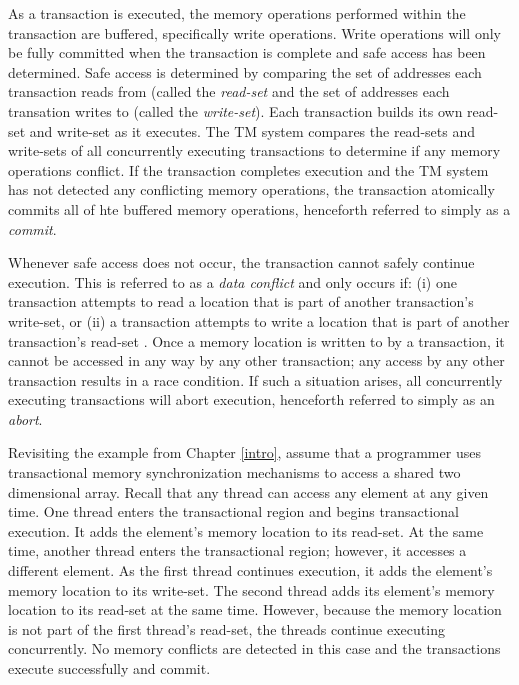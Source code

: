 \documentclass[11pt]{book}
\begin{document}


As a transaction is executed, the memory operations performed within the transaction are
buffered, specifically write operations.  Write operations will only be fully committed
when the transaction is complete and safe access has been determined.  Safe access is
determined by comparing the set of addresses each transaction reads from (called the
\emph{read-set} and the set of addresses each transation writes to (called the
\emph{write-set}).  Each transaction builds its own read-set and write-set as it executes.
The TM system compares the read-sets and write-sets of all concurrently executing
transactions to determine if any memory operations conflict.  If the transaction completes
execution and the TM system has not detected any conflicting memory operations, the
transaction atomically commits all of hte buffered memory operations, henceforth referred
to simply as a \emph{commit}.

Whenever safe access does not occur, the transaction cannot safely continue execution.
This is referred to as a \emph{data conflict} and only occurs if: (i) one transaction
attempts to read a location that is part of another transaction's write-set, or (ii) a
transaction attempts to write a location that is part of another transaction's read-set
\cite{intel_prog_ref}.  Once a memory location is written to by a transaction, it cannot
be accessed in any way by any other transaction; any access by any other transaction
results in a race condition.  If such a situation arises, all concurrently executing
transactions will abort execution, henceforth referred to simply as an \emph{abort}.

Revisiting the example from Chapter \ref{intro}, assume that a programmer uses
transactional memory synchronization mechanisms to access a shared two dimensional array.
Recall that any thread can access any element at any given time.  One thread enters the
transactional region and begins transactional execution.  It adds the element's memory
location to its read-set.  At the same time, another thread enters the transactional
region; however, it accesses a different element.  As the first thread continues
execution, it adds the element's memory location to its write-set.  The second thread adds
its element's memory location to its read-set at the same time.  However, because the
memory location is not part of the first thread's read-set, the threads continue executing
concurrently.  No memory conflicts are detected in this case and the transactions execute
successfully and commit.
\end{document}
